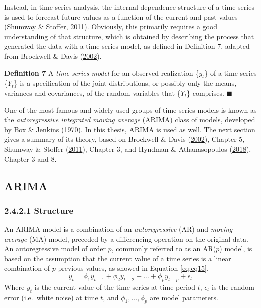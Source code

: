 \documentclass[12pt,oneside]{reedthesis}
\begin{document}
Instead, in time series analysis, the internal dependence structure of a
time series is used to forecast future values as a function of the
current and past values (Shumway \& Stoffer,
\protect\hyperlink{ref-shumway2011}{2011}). Obviously, this primarily
requires a good understanding of that structure, which is obtained by
describing the process that generated the data with a time series model,
as defined in Definition 7, adapted from Brockwell \& Davis
(\protect\hyperlink{ref-brockwell2002}{2002}).

\textbf{Definition 7} A \emph{time series model} for an observed
realization \{\(y_{t}\)\} of a time series \{\(Y_{t}\)\} is a
specification of the joint distributions, or possibly only the means,
variances and covariances, of the random variables that \{\(Y_{t}\)\}
comprises. \(\blacksquare\)

One of the most famous and widely used groups of time series models is
known as the \emph{autoregressive integrated moving average} (ARIMA)
class of models, developed by Box \& Jenkins
(\protect\hyperlink{ref-box1970}{1970}). In this thesis, ARIMA is used
as well. The next section gives a summary of its theory, based on
Brockwell \& Davis (\protect\hyperlink{ref-brockwell2002}{2002}),
Chapter 5, Shumway \& Stoffer
(\protect\hyperlink{ref-shumway2011}{2011}), Chapter 3, and Hyndman \&
Athanasopoulos (\protect\hyperlink{ref-hyndman2018fpp}{2018}), Chapter 3
and 8.

\subsection{ARIMA}\label{arima}

\subsubsection{2.4.2.1 Structure}\label{structure}

An ARIMA model is a combination of an \emph{autoregressive} (AR) and
\emph{moving average} (MA) model, preceded by a differencing operation
on the original data. An autoregressive model of order \(p\), commonly
referred to as an AR(\(p\)) model, is based on the assumption that the
current value of a time series is a linear combination of \(p\) previous
values, as showed in Equation \eqref{eq:eq15}.
\begin{equation}
y_{t} = \phi_{1}y_{t-1} + \phi_{2}y_{t-2} + ... + \phi_{p}y_{t-p} + \epsilon_{t}
\label{eq:eq15}
\end{equation}
Where \(y_{t}\) is the current value of the time series at time period
\(t\), \(\epsilon_{t}\) is the random error (i.e.~white noise) at time
\(t\), and \(\phi_{1},...,\phi_{p}\) are model parameters.
\end{document}
